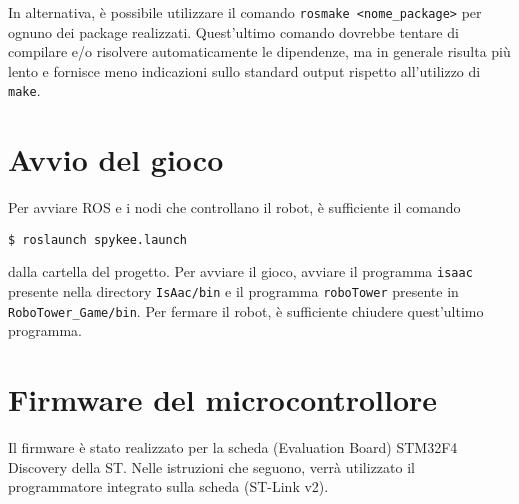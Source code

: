 \begin{nota}
In alternativa, è possibile utilizzare il comando \verb|rosmake <nome_package>| per ognuno dei package realizzati. Quest'ultimo comando dovrebbe tentare di compilare e/o risolvere automaticamente le dipendenze, ma in generale risulta più lento e fornisce meno indicazioni sullo standard output rispetto all'utilizzo di \verb|make|.
\end{nota}

\section{Avvio del gioco} Per avviare ROS e i nodi che controllano il robot, è sufficiente il comando
\begin{verbatim}
$ roslaunch spykee.launch
\end{verbatim}
dalla cartella del progetto. Per avviare il gioco, avviare il programma \verb|isaac| presente nella directory \verb|IsAac/bin| e il programma \verb|roboTower| presente in \verb|RoboTower_Game/bin|. Per fermare il robot, è sufficiente chiudere quest'ultimo programma.

\section{Firmware del microcontrollore}

Il firmware è stato realizzato per la scheda (Evaluation Board) STM32F4 Discovery della ST. Nelle istruzioni che seguono, verrà utilizzato il programmatore integrato sulla scheda (ST-Link v2).

